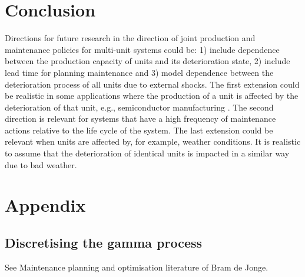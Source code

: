 \documentclass[a4paper,12pt]{article}
\begin{document}
\section{Conclusion}

Directions for future research in the direction of joint production and maintenance policies for multi-unit systems could be: 1) include dependence between the production capacity of units and its deterioration state, 2) include lead time for planning maintenance and 3) model dependence between the deterioration process of all units due to external shocks. The first extension could be realistic in some applications where the production of a unit is affected by the deterioration of that unit, e.g., semiconductor manufacturing \citep{kazaz2013impact}. The second direction is relevant for systems that have a high frequency of maintenance actions relative to the life cycle of the system. The last extension could be relevant when units are affected by, for example, weather conditions. It is realistic to assume that the deterioration of identical units is impacted in a similar way due to bad weather. 

 


\appendix

\section{Appendix}

\subsection{Discretising the gamma process}
See Maintenance planning and optimisation literature of Bram de Jonge.
\end{document}
